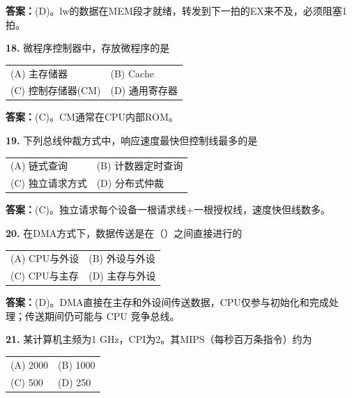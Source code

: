 \ifshowsolutions\par\noindent\textbf{答案：}(D)。lw的数据在MEM段才就绪，转发到下一拍的EX来不及，必须阻塞1拍。\else \answerarea \fi

\vspace{6pt}

\noindent\textbf{18.} 微程序控制器中，存放微程序的是
\begin{center}
\begin{tabular}{ll}
(A) 主存储器 & (B) Cache \\[6pt]
(C) 控制存储器(CM) & (D) 通用寄存器
\end{tabular}
\end{center}

\ifshowsolutions\par\noindent\textbf{答案：}(C)。CM通常在CPU内部ROM。\else \answerarea \fi

\vspace{6pt}

\noindent\textbf{19.} 下列总线仲裁方式中，响应速度最快但控制线最多的是
\begin{center}
\begin{tabular}{ll}
(A) 链式查询 & (B) 计数器定时查询 \\[6pt]
(C) 独立请求方式 & (D) 分布式仲裁
\end{tabular}
\end{center}

\ifshowsolutions\par\noindent\textbf{答案：}(C)。独立请求每个设备一根请求线+一根授权线，速度快但线数多。\else \answerarea \fi

\vspace{6pt}

\noindent\textbf{20.} 在DMA方式下，数据传送是在（\quad）之间直接进行的
\begin{center}
\begin{tabular}{ll}
(A) CPU与外设 & (B) 外设与外设 \\[6pt]
(C) CPU与主存 & (D) 主存与外设
\end{tabular}
\end{center}

\ifshowsolutions\par\noindent\textbf{答案：}(D)。DMA直接在主存和外设间传送数据，CPU仅参与初始化和完成处理；传送期间仍可能与 CPU 竞争总线。\else \answerarea \fi

\vspace{6pt}

\noindent\textbf{21.} 某计算机主频为1 GHz，CPI为2。其MIPS（每秒百万条指令）约为
\begin{center}
\begin{tabular}{ll}
(A) 2000 & (B) 1000 \\[6pt]
(C) 500 & (D) 250
\end{tabular}
\end{center}

